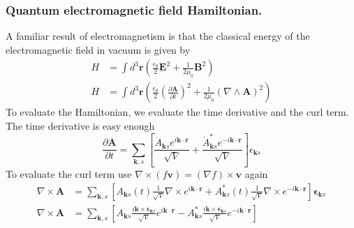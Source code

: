 \documentclass[../../../main.tex]{subfiles}
\begin{document}
\subsubsection{Quantum electromagnetic field Hamiltonian.}
A familiar result of electromagnetism is that the classical energy of the electromagnetic ﬁeld in vacuum is given by
\begin{align*}
  H & =  \int d^3 \mathbf{r} \left( \frac{\epsilon_0}{2} \mathbf{E}^2 + \frac{1}{2\mu_0} \mathbf{B}^2 \right)                                                                        \\
  H & =  \int d^3 \mathbf{r} \left( \frac{\epsilon_0}{2} \left( \frac{\partial \mathbf{A}}{\partial t} \right)^2 + \frac{1}{2\mu_0} \left( \nabla \land \mathbf{A} \right)^2 \right)
\end{align*}
To evaluate the Hamiltonian, we evaluate the time derivative and the curl term.
The time derivative is easy enough
\begin{equation*}
  \frac{\partial \mathbf{A}}{\partial t} = \sum_{\mathbf{k},s} \left[ \frac{\dot{A}_{\mathbf{k} s} e^{i \mathbf{k} \cdot \mathbf{r}}}{\sqrt{V}} + \frac{\dot{A}^*_{\mathbf{k} s} e^{-i \mathbf{k} \cdot \mathbf{r}}}{\sqrt{V}} \right] \epsilon_{\mathbf{k} s}
\end{equation*}
To evaluate the curl term use $\nabla \times (f \mathbf{v}) = (\nabla f) \times \mathbf{v}$ again
\begin{align*}
  \nabla \times \mathbf{A} & =  \sum_{\mathbf{k},s} \left[ A_{\mathbf{k}s}(t) \frac{1}{\sqrt{V}} \nabla \times  e^{i\mathbf{k} \cdot \mathbf{r}} + A_{\mathbf{k}s}^*(t) \frac{1}{\sqrt{V}}\nabla \times e^{-i\mathbf{k} \cdot \mathbf{r}} \right] \boldsymbol{\epsilon}_{\mathbf{k}s}                                             \\
  \nabla \times \mathbf{A} & =  \sum_{\mathbf{k},s} \left[ A_{\mathbf{k} s} \frac{i \mathbf{k} \times \boldsymbol{\epsilon}_{\mathbf{k} s}}{\sqrt{V}} e^{i \mathbf{k} \cdot \mathbf{r}} - A^*_{\mathbf{k} s} \frac{i \mathbf{k} \times \boldsymbol{\epsilon}_{\mathbf{k} s}}{\sqrt{V}} e^{-i \mathbf{k} \cdot \mathbf{r}} \right]
\end{align*}
\end{document}
